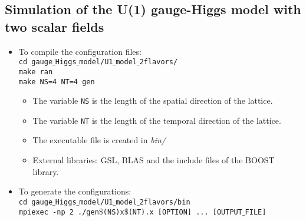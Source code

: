 \documentclass[a4paper,10pt]{report}
\begin{document}
\subsection*{Simulation of the U(1) gauge-Higgs model with two scalar fields}
\begin{itemize}[leftmargin=*]
 \item To compile the configuration files:
 \vspace*{2mm}
 \texttt{
 \\cd gauge$\_$Higgs$\_$model/U1$\_$model$\_$2flavors/
 \\make ran   
 \\make NS=4 NT=4 gen
 }

 \begin{itemize}[leftmargin=*]
  \item The variable {\tt NS} is the length of the spatial direction of the lattice.
  \item The variable {\tt NT} is the length of the temporal direction of the lattice.
  \item The executable file is created in {\it bin/}
  \item External libraries: GSL, BLAS and the include files of the BOOST library.
 \end{itemize}
 
 \item To generate the configurations:
 \vspace*{2mm}
 \texttt{
 \\cd gauge$\_$Higgs$\_$model/U1$\_$model$\_$2flavors/bin
 \\mpiexec -np 2 ./gen$\$$(NS)x$\$$(NT).x [OPTION] ... [OUTPUT$\_$FILE]
 }


\end{itemize}
\end{document}
